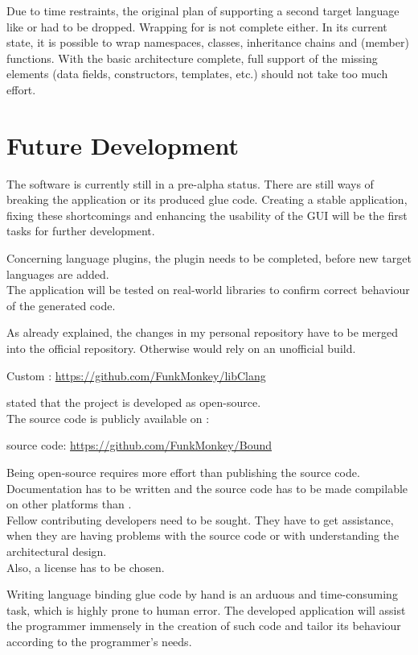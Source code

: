 Due to time restraints, the original plan of supporting a second target language like  or  had to be dropped. Wrapping for  is not complete either. In its current state, it is possible to wrap namespaces, classes, inheritance chains and (member) functions. With the basic architecture complete, full support of the missing elements (data fields, constructors, templates, etc.) should not take too much effort.


\chapter{Future Development}
\label{chap:FutureDevelopment}

The software is currently still in a pre-alpha status. There are still ways of breaking the application or its produced glue code. Creating a stable application, fixing these shortcomings and enhancing the usability of the GUI will be the first tasks for further development.

Concerning language plugins, the  plugin needs to be completed, before new target languages are added.\\
The application will be tested on real-world libraries to confirm correct behaviour of the generated code.

As already explained, the changes in my personal  repository have to be merged into the official repository. Otherwise  would rely on an unofficial  build.

\hspace{20pt} Custom : \url{https://github.com/FunkMonkey/libClang}

 stated that the project is developed as open-source.\\
The source code is publicly available on :

\hspace{20pt}  source code: \url{https://github.com/FunkMonkey/Bound}

Being open-source requires more effort than publishing the source code. Documentation has to be written and the source code has to be made compilable on other platforms than .\\
Fellow contributing developers need to be sought. They have to get assistance, when they are having problems with the source code or with understanding the architectural design.\\
Also, a license has to be chosen.

Writing language binding glue code by hand is an arduous and time-consuming task, which is highly prone to human error. The developed application will assist the programmer immensely in the creation of such code and tailor its behaviour according to the programmer's needs.